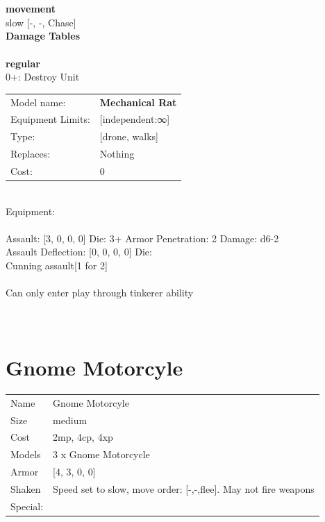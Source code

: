 \noindent \\ 


\ \\ {\bf movement } \\
slow [-, -, Chase] \\


{\bf Damage Tables} \\
\ \\ {\bf regular } \\
0+: Destroy Unit \\


\noindent
\begin{tabular}{ll}
Model name: &{\bf Mechanical Rat } \\
Equipment Limits: &[independent:∞] \\
Type: &[drone, walks] \\
Replaces: &Nothing \\
Cost: & 0\\
\end{tabular}
\ \\
Equipment:  \\
\ \\
Assault: [3, 0, 0, 0] Die: 3+ Armor Penetration: 2 Damage: d6-2 \\
Assault Deflection: [0, 0, 0, 0] Die: \\
\indent Cunning assault[1 for 2]\\ 
 
\ \\
Can only enter play through tinkerer ability\\ 

\ \\
 
\ \\













\clearpage

\section{ Gnome Motorcyle }

\begin{tabular}{ll}
  Name & Gnome Motorcyle \\
  Size & medium\\
  Cost & 2mp, 4cp, 4xp\\
  Models & 3 x Gnome Motorcycle\\
  Armor & [4, 3, 0, 0]\\
  Shaken & Speed set to slow, move order: [-,-,flee]. May not fire weapons\\
  Special: \\
\end{tabular}

